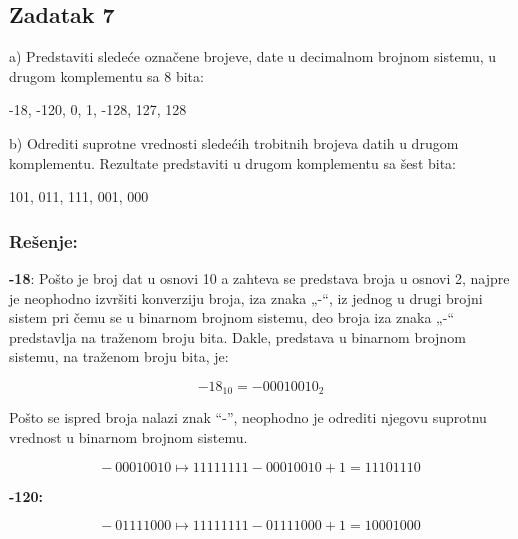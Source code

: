 \documentclass[a4paper,11pt]{article}
\numberwithin{equation}{section}
\begin{document}
\subsection{Zadatak 7}\label{sec:2.7}


a) Predstaviti sledeće označene brojeve, date u decimalnom brojnom sistemu, u drugom komplementu sa 8 bita:



-18, -120, 0, 1, -128, 127, 128



b) Odrediti suprotne vrednosti sledećih trobitnih brojeva datih u drugom komplementu. Rezultate predstaviti u drugom komplementu sa šest bita:

101, 011, 111, 001, 000



\subsubsection*{Rešenje:}


\textbf{-18}: Pošto je broj dat u osnovi 10 a zahteva se predstava broja u osnovi 2, najpre je neophodno izvršiti konverziju broja, iza znaka „-“, iz jednog u drugi brojni sistem pri čemu se u binarnom brojnom sistemu, deo broja iza znaka „-“ predstavlja na traženom broju bita. Dakle, predstava u binarnom brojnom sistemu, na traženom broju bita, je:



\begin{equation}\label{eq:2.7.1}
{- 18}_{10} = - 00010010_{2}
\end{equation}


Pošto se ispred broja nalazi znak “-”, neophodno je odrediti njegovu suprotnu vrednost u binarnom brojnom sistemu.



\begin{equation}\label{eq:2.7.2}
- \ 00010010 \longmapsto 11111111 - 00010010 + 1 = 11101110
\end{equation}


\textbf{-120:}



\begin{equation}\label{eq:2.7.3}
- \ 01111000 \longmapsto 11111111 - 01111000 + 1 = 10001000
\end{equation}
\end{document}

